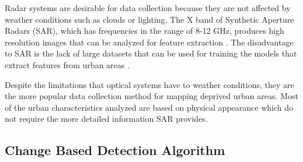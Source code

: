 \documentclass[conference]{IEEEtran}
\begin{document}
		Radar systems are desirable for data collection because they are not affected by weather conditions such as clouds or lighting.
		The X band of Synthetic Aperture Radars (SAR), which has frequencies in the range of 8-12 GHz, produces high resolution images that can be analyzed for feature extraction \cite{Wurm_2017}.
		The disadvantage to SAR is the lack of large datasets that can be used for training the models that extract features from urban areas \cite{Shi_Wenzhong_2020}.
		
		Despite the limitations that optical systems have to weather conditions, they are the more popular data collection method for mapping deprived urban areas.
		Most of the urban characteristics analyzed are based on physical appearance which do not require the more detailed information SAR provides. 


	\subsection{Change Based Detection Algorithm}
%
%
%


%
%




	\nocite{*}
	\printbibliography
	
\end{document}
